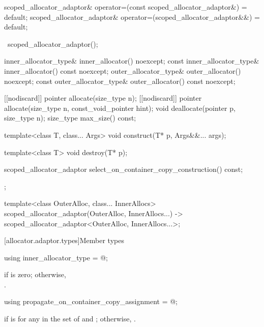 \begin{codeblock}
{{    scoped_allocator_adaptor& operator=(const scoped_allocator_adaptor&) = default;
    scoped_allocator_adaptor& operator=(scoped_allocator_adaptor&&) = default;

    ~scoped_allocator_adaptor();

    inner_allocator_type& inner_allocator() noexcept;
    const inner_allocator_type& inner_allocator() const noexcept;
    outer_allocator_type& outer_allocator() noexcept;
    const outer_allocator_type& outer_allocator() const noexcept;

    [[nodiscard]] pointer allocate(size_type n);
    [[nodiscard]] pointer allocate(size_type n, const_void_pointer hint);
    void deallocate(pointer p, size_type n);
    size_type max_size() const;

    template<class T, class... Args>
      void construct(T* p, Args&&... args);

    template<class T>
      void destroy(T* p);

    scoped_allocator_adaptor select_on_container_copy_construction() const;
  };

  template<class OuterAlloc, class... InnerAllocs>
    scoped_allocator_adaptor(OuterAlloc, InnerAllocs...)
      -> scoped_allocator_adaptor<OuterAlloc, InnerAllocs...>;
}
\end{codeblock}

[allocator.adaptor.types]{Member types}

%
\begin{itemdecl}
using inner_allocator_type = @\seebelow@;
\end{itemdecl}

\begin{itemdescr}
\pnum
\ctype {} if  is
zero; otherwise,\\ .
\end{itemdescr}

\begin{indexed}{}
\begin{itemdecl}
using propagate_on_container_copy_assignment = @\seebelow@;
\end{itemdecl}
\end{indexed}

\begin{itemdescr}
\pnum
\ctype {} if
 is
 for any  in the set of  and
; otherwise, .
\end{itemdescr}

